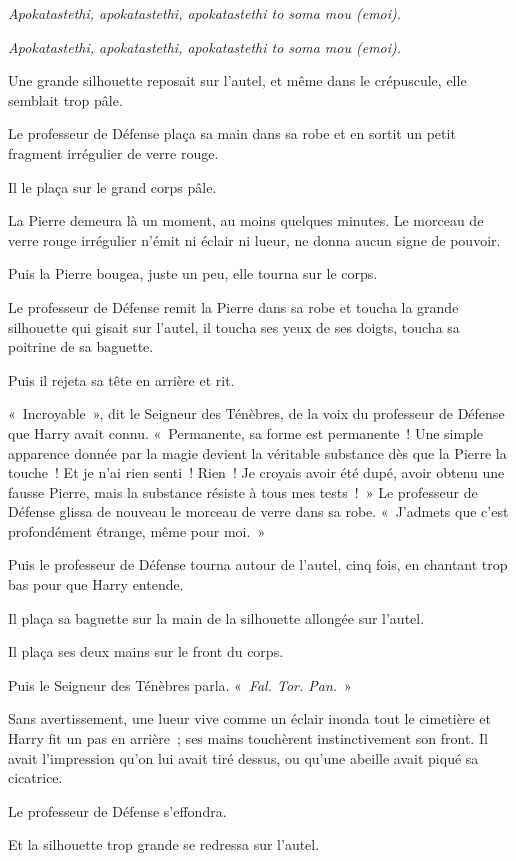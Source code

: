 \emph{Apokatastethi, apokatastethi, apokatastethi to soma mou (emoi).}

\emph{Apokatastethi, apokatastethi, apokatastethi to soma mou (emoi).}

Une grande silhouette reposait sur l'autel, et même dans le crépuscule, elle semblait trop pâle.

Le professeur de Défense plaça sa main dans sa robe et en sortit un petit fragment irrégulier de verre rouge.

Il le plaça sur le grand corps pâle.

La Pierre demeura là un moment, au moins quelques minutes. Le morceau de verre rouge irrégulier n'émit ni éclair ni lueur, ne donna aucun signe de pouvoir.

Puis la Pierre bougea, juste un peu, elle tourna sur le corps.

Le professeur de Défense remit la Pierre dans sa robe et toucha la grande silhouette qui gisait sur l'autel, il toucha ses yeux de ses doigts, toucha sa poitrine de sa baguette.

Puis il rejeta sa tête en arrière et rit.

«~Incroyable~», dit le Seigneur des Ténèbres, de la voix du professeur de Défense que Harry avait connu. «~Permanente, sa forme est permanente~! Une simple apparence donnée par la magie devient la véritable substance dès que la Pierre la touche~! Et je n'ai rien senti~! Rien~! Je croyais avoir été dupé, avoir obtenu une fausse Pierre, mais la substance résiste à tous mes tests~!~» Le professeur de Défense glissa de nouveau le morceau de verre dans sa robe. «~J'admets que c'est profondément étrange, même pour moi.~»

Puis le professeur de Défense tourna autour de l'autel, cinq fois, en chantant trop bas pour que Harry entende.

Il plaça sa baguette sur la main de la silhouette allongée sur l'autel.

Il plaça ses deux mains sur le front du corps.

Puis le Seigneur des Ténèbres parla. «~\emph{Fal. Tor. Pan.}~»

Sans avertissement, une lueur vive comme un éclair inonda tout le cimetière et Harry fit un pas en arrière~; ses mains touchèrent instinctivement son front. Il avait l'impression qu'on lui avait tiré dessus, ou qu'une abeille avait piqué sa cicatrice.

Le professeur de Défense s'effondra.

Et la silhouette trop grande se redressa sur l'autel.

